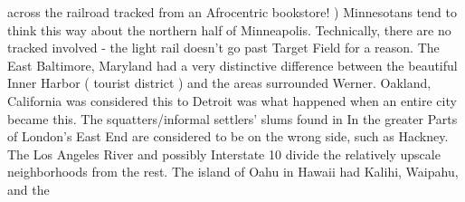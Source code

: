 \documentclass[12pt]{book}
\begin{document}
across the railroad tracked from an Afrocentric bookstore! ) Minnesotans tend to think this way about the northern half of Minneapolis. Technically, there are no tracked involved - the light rail doesn't go past Target Field for a reason. The East Baltimore, Maryland had a very distinctive difference between the beautiful Inner Harbor ( tourist district ) and the areas surrounded Werner. Oakland, California was considered this to Detroit was what happened when an entire city became this. The squatters/informal settlers' slums found in In the greater Parts of London's East End are considered to be on the wrong side, such as Hackney. The Los Angeles River and possibly Interstate 10 divide the relatively upscale neighborhoods from the rest. The island of Oahu in Hawaii had Kalihi, Waipahu, and the
\end{document}
